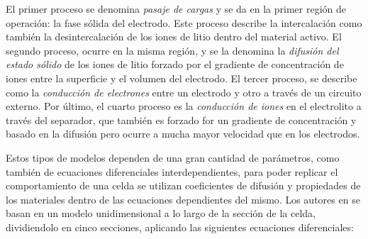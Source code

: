 \documentclass[10pt,a4paper]{article}
\begin{document}
\noindent El primer proceso se denomina \emph{pasaje de cargas} y se da en 
la primer regi\'on de operaci\'on: la fase s\'olida del electrodo. 
Este proceso describe la intercalaci\'on como tambi\'en la desintercalaci\'on 
de los iones de litio dentro del material activo. El segundo proceso, ocurre 
en la misma regi\'on, y se la denomina la \emph{difusi\'on del estado s\'olido} 
de los iones de litio forzado por el gradiente de concentraci\'on de iones entre 
la superficie y el volumen del electrodo. El tercer proceso, se describe como 
la \emph{conducci\'on de electrones} entre un electrodo y otro a trav\'es de 
un circuito externo. Por \'ultimo, el cuarto proceso es la \emph{conducci\'on de 
iones} en el electrolito a trav\'es del separador, que tambi\'en es forzado for 
un gradiente de concentraci\'on y basado en la difusi\'on pero ocurre a mucha 
mayor velocidad que en los electrodos.

\noindent Estos tipos de modelos dependen de una gran cantidad de par\'ametros,
como tambi\'en de ecuaciones diferenciales interdependientes, para poder 
replicar el comportamiento de una celda se utilizan coeficientes de difusi\'on y 
propiedades de los materiales dentro de las ecuaciones dependientes del mismo. 
Los autores en \cite{Li2016} se basan en un modelo unidimensional a lo largo de 
la secci\'on de la celda, dividiendolo en cinco secciones, aplicando las 
siguientes ecuaciones diferenciales: 
\end{document}
